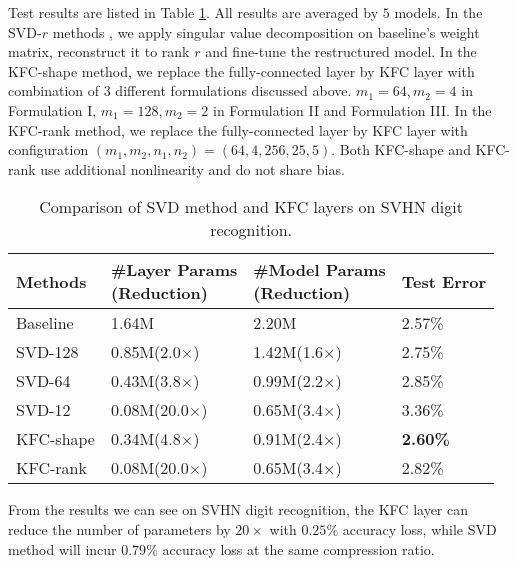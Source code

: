\documentclass{article}
\begin{document}

Test results are listed in Table \ref{tab:svhn_approximation}. All results are averaged by $5$ models. In the SVD-$r$ methods
\cite{xue2013restructuring,denton2014exploiting}, we apply singular value decomposition on baseline's weight matrix, reconstruct it to rank $r$ and
fine-tune the restructured model. In the KFC-shape method, we replace the fully-connected layer by KFC layer with combination of $3$ different
formulations discussed above. $m_1 = 64, m_2 = 4$ in Formulation I, $m_1 = 128, m_2 = 2$ in Formulation II and Formulation III. In the KFC-rank
method, we replace the fully-connected layer by KFC layer with configuration $(m_1,m_2,n_1,n_2) = (64, 4, 256, 25, 5)$. Both KFC-shape and KFC-rank use additional nonlinearity and do not share bias.
\begin{table}[!ht] \centering \small
  \caption{Comparison of SVD method and KFC layers on SVHN digit recognition.}
\centering
\begin{tabular}{p{1.45cm} p{1.95cm} p{2cm} p{1.3cm}}
    \toprule \parbox[c]{\hsize}{Methods}  & \parbox[c]{1.95cm}{\#Layer Params\\(Reduction)} & \parbox[c]{2cm}{\#Model Params\\(Reduction)} & \parbox[c]{\hsize}{Test Error} \\
    \midrule Baseline & 1.64M & 2.20M & 2.57\% \\
    \midrule SVD-128 & 0.85M(2.0$\times$) & 1.42M(1.6$\times$) & 2.75\% \\
    \midrule SVD-64 & 0.43M(3.8$\times$) & 0.99M(2.2$\times$) & 2.85\% \\
    \midrule SVD-12 & 0.08M(20.0$\times$) & 0.65M(3.4$\times$) & 3.36\% \\
    \midrule KFC-shape & 0.34M(4.8$\times$) & 0.91M(2.4$\times$) & \textbf{2.60\%} \\
    \midrule KFC-rank & 0.08M(20.0$\times$) & 0.65M(3.4$\times$) & 2.82\% \\
\hline
\end{tabular}
\label{tab:svhn_approximation}
\end{table}

From the results we can see on SVHN digit recognition,
the KFC layer can reduce the number of parameters by $20\times$ with $0.25\%$ accuracy loss,
while SVD method will incur $0.79\%$ accuracy loss at the same compression ratio.
\end{document}
